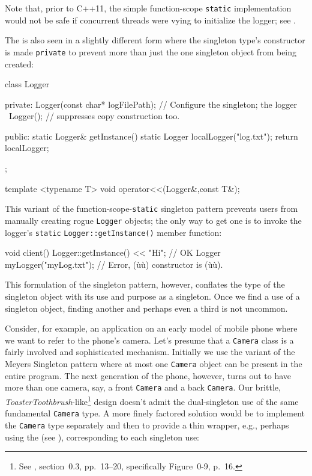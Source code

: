\noindent Note that, prior to C++11, the simple function-scope \lstinline!static!
implementation would not be safe if concurrent threads were vying to
initialize the logger; see .

The  is also seen in a slightly different form
where the singleton type's constructor is made \lstinline!private! to
prevent more than just the one singleton object from being created:

\begin{emcppslisting}[emcppsbatch=e10]
class Logger
{
private:
    Logger(const char* logFilePath);  // Configure the singleton; the logger
    ~Logger();                        // suppresses copy construction too.

public:
    static Logger& getInstance()
    {
        static Logger localLogger("log.txt");
        return localLogger;
    }
};
\end{emcppslisting}
\begin{emcppshiddenlisting}[emcppsbatch=e10]
template <typename T>
void operator<<(Logger&,const T&);
\end{emcppshiddenlisting}

\noindent This variant of the function-scope-\lstinline!static! singleton pattern
prevents users from manually creating rogue \lstinline!Logger! objects; the
only way to get one is to invoke the logger's \lstinline!static!
\lstinline!Logger::getInstance()! member function:

\begin{emcppslisting}[emcppsbatch=e10]
void client()
{
    Logger::getInstance() << "Hi";  // OK
    Logger myLogger("myLog.txt");   // Error, (ù{}ù) constructor is (ù{}ù).
}
\end{emcppslisting}

\noindent This formulation of the singleton pattern, however, conflates the type
of the singleton object with its use and purpose as a singleton. Once we
find a use of a singleton object, finding another and perhaps even a
third is not uncommon.

Consider, for example, an application on an early
model of mobile phone where we want to refer to the phone's camera.
Let's presume that a \lstinline!Camera! class is a fairly involved and
sophisticated mechanism. Initially we use the variant of the Meyers
Singleton pattern where at most one \lstinline!Camera! object can be
present in the entire program. The next generation of the phone, however, turns out to have more than
one camera, say, a front \lstinline!Camera! and a back \lstinline!Camera!. Our
brittle, \emph{ToasterToothbrush}-like\footnote{See \cite{lakos20}, section~0.3, pp.~13--20, specifically
Figure~0-9, p.~16.} design doesn't
admit the dual-singleton use of the same fundamental \lstinline!Camera!
type. A more finely factored solution would be to implement the
\lstinline!Camera! type separately and then to provide a thin wrapper,
e.g., perhaps using the  (see ), corresponding to each singleton
use:

